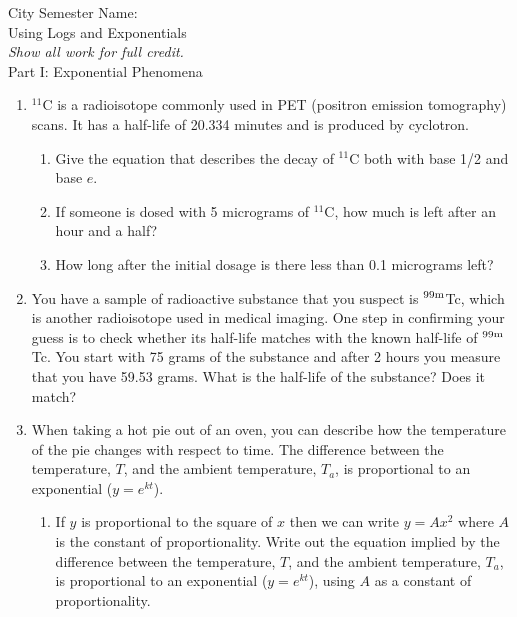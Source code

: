 \documentclass[12pt]{article}
\theoremstyle{plain}     %
\begin{document}
\large
City Semester  \hspace{8cm} Name:\makebox[6cm]{\hrulefill}
\\
Using Logs and Exponentials\\
\normalsize 
\emph{Show all work for full credit.}\\[.5cm]
Part I: Exponential Phenomena
\begin{enumerate}
	\item $^{11}$C is a radioisotope commonly used in PET (positron emission tomography) scans. It has a half-life of 20.334 minutes and is produced by cyclotron.
		\begin{enumerate}
			\item Give the equation that describes the decay of $^{11}$C both with base 1/2 and base $e$.\\
			\item If someone is dosed with 5 micrograms of $^{11}$C, how much is left after an hour and a half?\\
			\item How long after the initial dosage is there less than 0.1 micrograms left?\\[.5cm]
		\end{enumerate}
	\item You have a sample of radioactive substance that you suspect is $^{99\textnormal{m}}$Tc, which is another radioisotope used in medical imaging. One step in confirming your guess is to check whether its half-life matches with the known half-life of $^{99\textnormal{m}}$Tc. You start with 75 grams of the substance and after 2 hours you measure that you have 59.53 grams. What is the half-life of the substance? Does it match?\\[.5cm]
	\item When taking a hot pie out of an oven, you can describe how the temperature of the pie changes with respect to time. The difference between the temperature, $T$, and the ambient temperature, $T_a$, is proportional to an exponential ($y=e^{kt}$).
		\begin{enumerate}
			\item If $y$ is proportional to the square of $x$ then we can write $y=Ax^2$ where $A$ is the constant of proportionality. Write out the equation implied by the difference between the temperature, $T$, and the ambient temperature, $T_a$, is proportional to an exponential ($y=e^{kt}$), using $A$ as a constant of proportionality.\\

\end{enumerate}
\end{enumerate}
\end{document}
